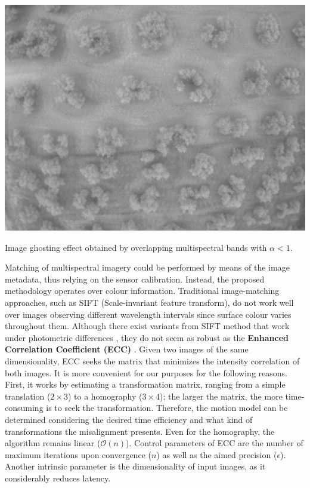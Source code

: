 \begin{marginfigure}[.2cm]
  \includegraphics{figs/image_fusion/multispectral_ghost_effect.png}
  \caption{Image ghosting effect obtained by overlapping multispectral bands with $\alpha < 1$.}
  \label{fig:multispectral_ghost_effect}
\end{marginfigure}
Matching of multispectral imagery could be performed by means of the image metadata, thus relying on the sensor calibration. Instead, the proposed methodology operates over colour information. Traditional image-matching approaches, such as SIFT (Scale-invariant feature transform), do not work well over images observing different wavelength intervals since surface colour varies throughout them. Although there exist variants from SIFT method that work under photometric differences \cite{park_pi-sift_2008}, they do not seem as robust as the \textbf{Enhanced Correlation Coefficient (ECC)} \cite{evangelidis_parametric_2008}. Given two images of the same dimensionality, ECC seeks the matrix that minimizes the intensity correlation of both images. It is more convenient for our purposes for the following reasons. First, it works by estimating a transformation matrix, ranging from a simple translation ($2 \times 3$) to a homography ($3 \times 4$); the larger the matrix, the more time-consuming is to seek the transformation. Therefore, the motion model can be determined considering the desired time efficiency and what kind of transformations the misalignment presents. Even for the homography, the algorithm remains linear ($\mathcal{O}(n)$). Control parameters of ECC are the number of maximum iterations upon convergence ($n$) as well as the aimed precision ($\epsilon$). Another intrinsic parameter is the dimensionality of input images, as it considerably reduces latency.

